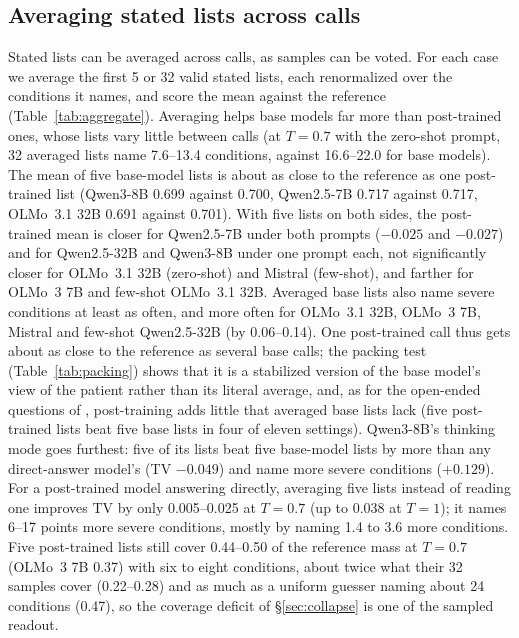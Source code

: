 \documentclass[11pt]{article}
\begin{document}
\subsection{Averaging stated lists across calls}\label{sec:aggregate}
Stated lists can be averaged across calls, as samples can be voted. For each case we average the first 5 or 32 valid stated lists, each renormalized over the conditions it names, and score the mean against the reference (Table~\ref{tab:aggregate}). Averaging helps base models far more than post-trained ones, whose lists vary little between calls (at $T{=}0.7$ with the zero-shot prompt, 32 averaged lists name 7.6--13.4 conditions, against 16.6--22.0 for base models). The mean of five base-model lists is about as close to the reference as one post-trained list (Qwen3-8B 0.699 against 0.700, Qwen2.5-7B 0.717 against 0.717, OLMo~3.1 32B 0.691 against 0.701). With five lists on both sides, the post-trained mean is closer for Qwen2.5-7B under both prompts ($-0.025$ and $-0.027$) and for Qwen2.5-32B and Qwen3-8B under one prompt each, not significantly closer for OLMo~3.1 32B (zero-shot) and Mistral (few-shot), and farther for OLMo~3 7B and few-shot OLMo~3.1 32B. Averaged base lists also name severe conditions at least as often, and more often for OLMo~3.1 32B, OLMo~3 7B, Mistral and few-shot Qwen2.5-32B (by 0.06--0.14). One post-trained call thus gets about as close to the reference as several base calls; the packing test (Table~\ref{tab:packing}) shows that it is a stabilized version of the base model's view of the patient rather than its literal average, and, as for the open-ended questions of \citet{lake2025overton}, post-training adds little that averaged base lists lack (five post-trained lists beat five base lists in four of eleven settings). Qwen3-8B's thinking mode goes furthest: five of its lists beat five base-model lists by more than any direct-answer model's (TV $-0.049$) and name more severe conditions ($+0.129$). For a post-trained model answering directly, averaging five lists instead of reading one improves TV by only 0.005--0.025 at $T{=}0.7$ (up to 0.038 at $T{=}1$); it names 6--17 points more severe conditions, mostly by naming 1.4 to 3.6 more conditions. Five post-trained lists still cover 0.44--0.50 of the reference mass at $T{=}0.7$ (OLMo~3 7B 0.37) with six to eight conditions, about twice what their 32 samples cover (0.22--0.28) and as much as a uniform guesser naming about 24 conditions (0.47), so the coverage deficit of \S\ref{sec:collapse} is one of the sampled readout.
\end{document}

